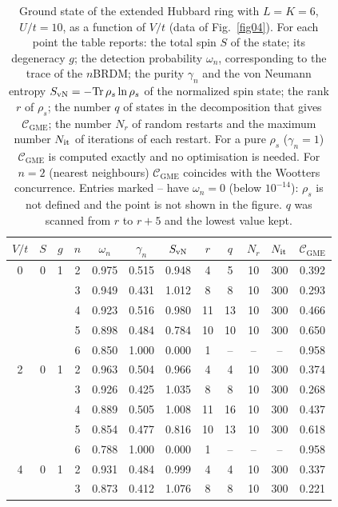 \documentclass[12pt]{article}
\begin{document}
\begin{table}
\caption{Ground state of the extended Hubbard ring with $L=K=6$, $U/t=10$, as a function of $V/t$ (data of Fig.~\ref{fig04}). For each point the table reports: the total spin $S$ of the state; its degeneracy $g$; the detection probability $\omega_n$, corresponding to the trace of the $n$BRDM; the purity $\gamma_n$ and the von Neumann entropy $S_{\rm vN}=-\mathrm{Tr}\,\rho_s\ln\rho_s$ of the normalized spin state; the rank $r$ of $\rho_s$; the number $q$ of states in the decomposition that gives $\mathcal{C}_{\mathrm{GME}}$; the number $N_r$ of random restarts and the maximum number $N_{\rm it}$ of iterations of each restart. For a pure $\rho_s$ ($\gamma_n=1$) $\mathcal{C}_{\mathrm{GME}}$ is computed exactly and no optimisation is needed. For $n=2$ (nearest neighbours) $\mathcal{C}_{\mathrm{GME}}$ coincides with the Wootters concurrence. Entries marked -- have $\omega_n=0$ (below $10^{-14}$): $\rho_s$ is not defined and the point is not shown in the figure. $q$ was scanned from $r$ to $r+5$ and the lowest value kept.}
\label{tab:vscan_L6}
\begin{ruledtabular}
\begin{tabular}{cccccccccccc}
$V/t$ & $S$ & $g$ & $n$ & $\omega_n$ & $\gamma_n$ & $S_{\rm vN}$ & $r$ & $q$ & $N_r$ & $N_{\rm it}$ & $\mathcal{C}_{\mathrm{GME}}$ \\
\hline
0 & 0 & 1 & 2 & 0.975 & 0.515 & 0.948 & 4 & 5 & 10 & 300 & 0.392 \\
 & &  & 3 & 0.949 & 0.431 & 1.012 & 8 & 8 & 10 & 300 & 0.293 \\
 & &  & 4 & 0.923 & 0.516 & 0.980 & 11 & 13 & 10 & 300 & 0.466 \\
 & &  & 5 & 0.898 & 0.484 & 0.784 & 10 & 10 & 10 & 300 & 0.650 \\
 & &  & 6 & 0.850 & 1.000 & 0.000 & 1 & -- & -- & -- & 0.958 \\
\hline
2 & 0 & 1 & 2 & 0.963 & 0.504 & 0.966 & 4 & 4 & 10 & 300 & 0.374 \\
 & &  & 3 & 0.926 & 0.425 & 1.035 & 8 & 8 & 10 & 300 & 0.268 \\
 & &  & 4 & 0.889 & 0.505 & 1.008 & 11 & 16 & 10 & 300 & 0.437 \\
 & &  & 5 & 0.854 & 0.477 & 0.816 & 10 & 13 & 10 & 300 & 0.618 \\
 & &  & 6 & 0.788 & 1.000 & 0.000 & 1 & -- & -- & -- & 0.958 \\
\hline
4 & 0 & 1 & 2 & 0.931 & 0.484 & 0.999 & 4 & 4 & 10 & 300 & 0.337 \\
 & &  & 3 & 0.873 & 0.412 & 1.076 & 8 & 8 & 10 & 300 & 0.221 \\

\end{tabular}
\end{ruledtabular}
\end{table}
\end{document}
